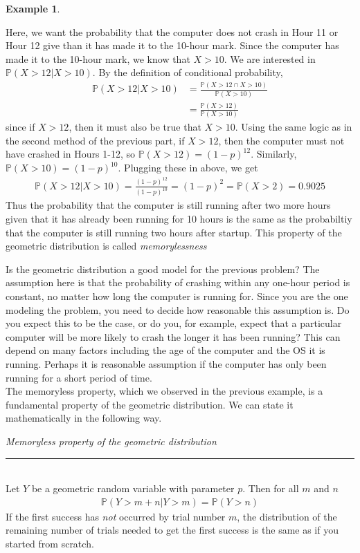 \documentclass[12pt]{article}
\theoremstyle{definition}
\newtheorem*{example}{Example}
\theoremstyle{remark}
\def\P{{\mathbb P}}
\begin{document}
\begin{example}
\begin{enumerate}
Here, we want the probability that the computer does not crash in Hour 11 or Hour 12 give than it has made it to the 10-hour mark. Since the computer has made it to the 10-hour mark, we know that $X > 10$. We are interested in $\P(X > 12 | X > 10)$. By the definition of conditional probability,
\begin{align*}
\P(X > 12 | X > 10) &= \frac{\P(X > 12 \cap X > 10)}{\P(X>10)}\\
&= \frac{\P(X > 12)}{\P(X>10)}
\end{align*}
since if $X > 12$, then it must also be true that $X > 10$. Using the same logic as in the second method of the previous part, if $X>12$, then the computer must not have crashed in Hours 1-12, so $\P(X > 12) = (1-p)^{12}$. Similarly, $\P(X > 10) = (1-p)^{10}$. Plugging these in above, we get
\begin{align*}
\P(X > 12 | X > 10) = \frac{(1-p)^{12}}{(1-p)^{10}} = (1-p)^2 = \P(X > 2) = 0.9025
\end{align*}
Thus the probability that the computer is still running after two more hours given that it has already been running for 10 hours is the same as the probabiltiy that the computer is still running two hours after startup. This property of the geometric distribution is called \emph{memorylessness}
\end{enumerate}
\end{example}

Is the geometric distribution a good model for the previous problem? The assumption here is that the probability of crashing within any one-hour period is constant, no matter how long the computer is running for. Since you are the one modeling the problem, you need to decide how reasonable this assumption is. Do you expect this to be the case, or do you, for example, expect that a particular computer will be more likely to crash the longer it has been running? This can depend on many factors including the age of the computer and the OS it is running. Perhaps it is reasonable assumption if the computer has only been running for a short period of time. \\

The memoryless property, which we observed in the previous example, is a fundamental property of the geometric distribution. We can state it mathematically in the following way.

\begin{framed}
\emph{Memoryless property of the geometric distribution}\\
  \rule{\dimexpr{}\fboxrule}{.1pt} \\
Let $Y$ be a geometric random variable with parameter $p$. Then for all $m$ and $n$
\begin{align*}
\P(Y > m + n | Y > m) = \P(Y > n)
\end{align*}
If the first success has \emph{not} occurred by trial number $m$, the distribution of the remaining number of trials needed to get the first success is the same as if you started from scratch.
\end{framed}
\end{document}
